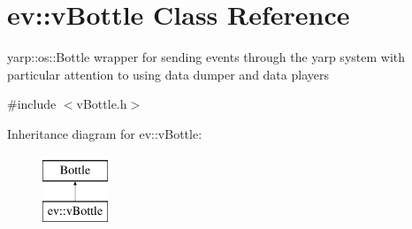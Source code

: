 \hypertarget{classev_1_1vBottle}{}\section{ev\+:\+:v\+Bottle Class Reference}
\label{classev_1_1vBottle}


yarp\+::os\+::\+Bottle wrapper for sending events through the yarp system with particular attention to using data dumper and data players  




{\ttfamily \#include $<$v\+Bottle.\+h$>$}

Inheritance diagram for ev\+:\+:v\+Bottle\+:\begin{figure}[H]
\begin{center}
\leavevmode
\includegraphics[height=2.000000cm]{classev_1_1vBottle}
\end{center}
\end{figure}
